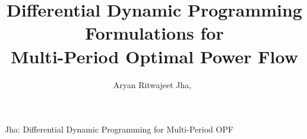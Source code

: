\documentclass[lettersize,journal]{IEEEtran}
\begin{document}
\title{Differential Dynamic Programming Formulations for\\
Multi-Period Optimal Power Flow}

\author{Aryan Ritwajeet Jha,~}

%
{Jha: Differential Dynamic Programming for Multi-Period OPF}

\maketitle





\appendices





\end{document}
